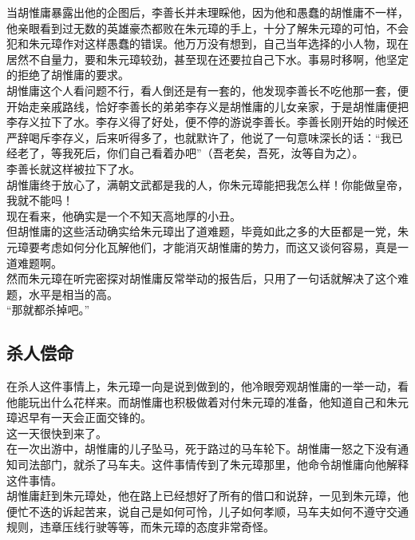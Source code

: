 \begin{multicols}{\theparacolNo}
当胡惟庸暴露出他的企图后，李善长并未理睬他，因为他和愚蠢的胡惟庸不一样，他亲眼看到过无数的英雄豪杰都败在朱元璋的手上，十分了解朱元璋的可怕，不会犯和朱元璋作对这样愚蠢的错误。他万万没有想到，自己当年选择的小人物，现在居然不自量力，要和朱元璋较劲，甚至现在还要拉自己下水。事易时移啊，他坚定的拒绝了胡惟庸的要求。\\

胡惟庸这个人看问题不行，看人倒还是有一套的，他发现李善长不吃他那一套，便开始走亲戚路线，恰好李善长的弟弟李存义是胡惟庸的儿女亲家，于是胡惟庸便把李存义拉下了水。李存义得了好处，便不停的游说李善长。李善长刚开始的时候还严辞喝斥李存义，后来听得多了，也就默许了，他说了一句意味深长的话：“我已经老了，等我死后，你们自己看着办吧”（吾老矣，吾死，汝等自为之）。\\

李善长就这样被拉下了水。\\

胡惟庸终于放心了，满朝文武都是我的人，你朱元璋能把我怎么样！你能做皇帝，我就不能吗！\\

现在看来，他确实是一个不知天高地厚的小丑。\\

但胡惟庸的这些活动确实给朱元璋出了道难题，毕竟如此之多的大臣都是一党，朱元璋要考虑如何分化瓦解他们，才能消灭胡惟庸的势力，而这又谈何容易，真是一道难题啊。\\

然而朱元璋在听完密探对胡惟庸反常举动的报告后，只用了一句话就解决了这个难题，水平是相当的高。\\

“那就都杀掉吧。”\\

\subsection{杀人偿命}
在杀人这件事情上，朱元璋一向是说到做到的，他冷眼旁观胡惟庸的一举一动，看他能玩出什么花样来。而胡惟庸也积极做着对付朱元璋的准备，他知道自己和朱元璋迟早有一天会正面交锋的。\\

这一天很快到来了。\\

在一次出游中，胡惟庸的儿子坠马，死于路过的马车轮下。胡惟庸一怒之下没有通知司法部门，就杀了马车夫。这件事情传到了朱元璋那里，他命令胡惟庸向他解释这件事情。\\

胡惟庸赶到朱元璋处，他在路上已经想好了所有的借口和说辞，一见到朱元璋，他便忙不迭的诉起苦来，说自己是如何可怜，儿子如何孝顺，马车夫如何不遵守交通规则，违章压线行驶等等，而朱元璋的态度非常奇怪。\\


\end{multicols}
